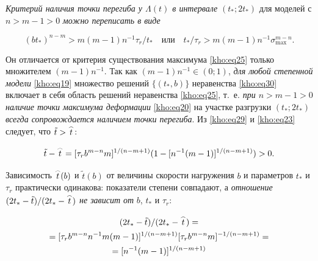 \textit{Критерий наличия точки перегиба у $\Lambda(t)$ в интервале }$(t_\ast;2t_\ast)$ для моделей с $n>m-1>0$ \textit{можно переписать в виде }

\begin{equation}

\label{kho:eq30}

(bt_\ast)^{n-m}>m(m-1)n^{-1}\tau_r/t_\ast \text{ ~~или~~ } t_\ast/\tau_r>m(m-1)n^{-1}\sigma_{\max}^{m-n} .

\end{equation}

Он отличается от критерия существования максимума \eqref{kho:eq25} только множителем $(m-1)n^{-1}$. Так как $(m-1)n^{-1}\in(0;1)$, \textit{для любой степенной модели} \eqref{kho:eq19} множество решений $\{(t_\ast,b)\}$ неравенства \eqref{kho:eq30} включает в себя область решений неравенства \eqref{kho:eq25}, т.~е. \textit{при $n>m-1>0$ наличие точки максимума деформации} \eqref{kho:eq20} на участке разгрузки $(t_\ast;2t_\ast)$ \textit{всегда сопровождается наличием точки перегиба}. Из \eqref{kho:eq29} и \eqref{kho:eq23} следует, что $\tilde{t}>\mathord{\buildrel{\lower3pt\hbox{$\scriptscriptstyle\frown$}}\over{t}}$:

\[

\tilde{t}-\mathord{\buildrel{\lower3pt\hbox{$\scriptscriptstyle\frown$}}\over{t}}=[\tau_rb^{m-n}m]^{1/(n-m+1)}(1-[n^{-1}(m-1)]^{1/(n-m+1)})>0.

\]



Зависимость $\mathord{\buildrel{\lower3pt\hbox{$\scriptscriptstyle\frown$}}\over{t}}(b)$ и $\tilde{t}(b)$ от величины скорости нагружения $b$ и параметров $t_\ast$ и $\tau_r$ практически одинакова: показатели степени совпадают, а \textit{отношение $(2t_\ast-\tilde{t})/(2t_\ast-\mathord{\buildrel{\lower3pt\hbox{$\scriptscriptstyle\frown$}}\over{t}})$ не зависит от }$b$, $t_\ast$ и $\tau_r$:

\begin{multline}

\label{kho:eq31}

(2t_\ast-\tilde{t})/(2t_\ast-\mathord{\buildrel{\lower3pt\hbox{$\scriptscriptstyle\frown$}}\over{t}}) = \\ =[\tau_rb^{m-n}n^{-1}m(m-1)]^{1/(n-m+1)}[\tau_rb^{m-n}m]^{-1/(n-m+1)}= 

\\

=[n^{-1}(m-1)]^{1/(n-m+1)} 

\end{multline}

